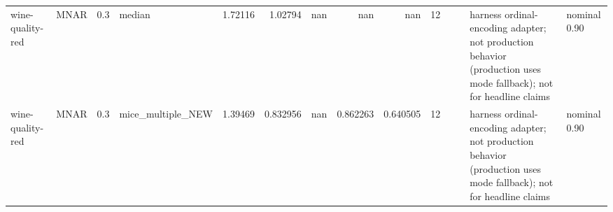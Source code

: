 \begin{table}[ht]
\begin{tabular}{llrlrrrrrrllll}
 wine-quality-red     & MNAR        &         0.3 & median            &       1.72116  &             1.02794  &               nan        &                     nan        &                       nan        &        12 &                    &                                         & harness ordinal-encoding adapter; not production behavior (production uses mode fallback); not for headline claims & nominal 0.90              \\
 wine-quality-red     & MNAR        &         0.3 & mice\_multiple\_NEW &       1.39469  &             0.832956 &               nan        &                       0.862263 &                         0.640505 &        12 &                    &                                         & harness ordinal-encoding adapter; not production behavior (production uses mode fallback); not for headline claims & nominal 0.90              \\
\hline
\end{tabular}
\end{table}
